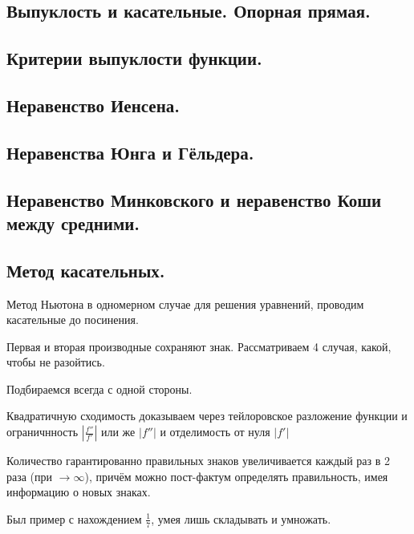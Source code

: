 \documentclass[12pt, a4paper]{article}
\begin{document}
\subsection{Выпуклость и касательные. Опорная прямая.}



\subsection{Критерии выпуклости функции.}



\subsection{Неравенство Иенсена.}



\subsection{Неравенства Юнга и Гёльдера.}



\subsection{Неравенство Минковского и неравенство Коши между средними.}



\subsection{Метод касательных.}

Метод Ньютона в одномерном случае для решения уравнений, проводим касательные до посинения.

Первая и вторая производные сохраняют знак. 
Рассматриваем 4 случая, какой, чтобы не разойтись.

Подбираемся всегда с одной стороны.

Квадратичную сходимость доказываем через тейлоровское разложение функции 
и ограничнность $\left| \frac{f''}{f'} \right|$ или же $\left| f'' \right|$ и отделимость от нуля $\left| f' \right|$

Количество гарантированно правильных знаков увеличивается каждый раз в 2 раза (при $\rightarrow \infty$), причём можно пост-фактум определять правильность, имея информацию о новых знаках.

Был пример с нахождением $\frac{1}{7}$, умея лишь складывать и умножать.
\end{document}
